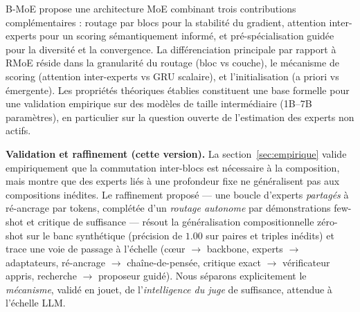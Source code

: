\documentclass[10pt,a4paper]{article}
\begin{document}
B-MoE propose une architecture MoE combinant trois contributions complémentaires : routage par blocs pour la stabilité du gradient, attention inter-experts pour un scoring sémantiquement informé, et pré-spécialisation guidée pour la diversité et la convergence. La différenciation principale par rapport à RMoE \cite{qiu2025rmoe} réside dans la granularité du routage (bloc vs couche), le mécanisme de scoring (attention inter-experts vs GRU scalaire), et l'initialisation (a priori vs émergente). Les propriétés théoriques établies constituent une base formelle pour une validation empirique sur des modèles de taille intermédiaire (1B--7B paramètres), en particulier sur la question ouverte de l'estimation des experts non actifs.

\medskip
\noindent\textbf{Validation et raffinement (cette version).} La section~\ref{sec:empirique} valide empiriquement que la commutation inter-blocs est nécessaire à la composition, mais montre que des experts liés à une profondeur fixe ne généralisent pas aux compositions inédites. Le raffinement proposé --- une boucle d'experts \emph{partagés} à ré-ancrage par tokens, complétée d'un \emph{routage autonome} par démonstrations few-shot et critique de suffisance --- résout la généralisation compositionnelle zéro-shot sur le banc synthétique (précision de $1.00$ sur paires et triples inédits) et trace une voie de passage à l'échelle (c\oe ur $\to$ backbone, experts $\to$ adaptateurs, ré-ancrage $\to$ chaîne-de-pensée, critique exact $\to$ vérificateur appris, recherche $\to$ proposeur guidé). Nous séparons explicitement le \emph{mécanisme}, validé en jouet, de l'\emph{intelligence du juge} de suffisance, attendue à l'échelle LLM.
\end{document}
